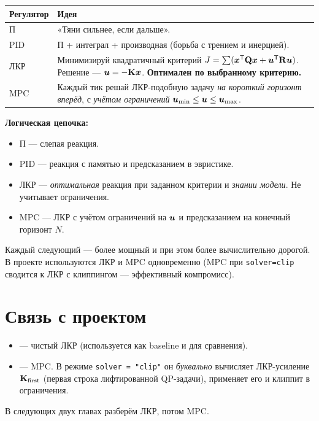 \begin{center}
\begin{tabular}{lp{8cm}}
\toprule
\textbf{Регулятор} & \textbf{Идея}\\
\midrule
П    & «Тяни сильнее, если дальше».\\
PID  & П + интеграл + производная (борьба с трением и инерцией).\\
ЛКР  & Минимизируй квадратичный критерий $J = \sum (\bm{x}^{\mathsf{T}} \mathbf{Q}\bm{x}
       + \bm{u}^{\mathsf{T}} \mathbf{R}\bm{u})$. Решение --- $\bm{u} = -\mathbf{K}\bm{x}$.
       \textbf{Оптимален по выбранному критерию.}\\
MPC  & Каждый тик решай ЛКР-подобную задачу \emph{на короткий горизонт
       вперёд}, с \emph{учётом ограничений} $\bm{u}_\text{min} \le \bm{u} \le \bm{u}_\text{max}$.\\
\bottomrule
\end{tabular}
\end{center}

\begin{ideabox}
\textbf{Логическая цепочка:}
\begin{itemize}
  \item П --- слепая реакция.
  \item PID --- реакция с памятью и предсказанием в эвристике.
  \item ЛКР --- \emph{оптимальная} реакция при заданном критерии и
        \emph{знании модели}. Не учитывает ограничения.
  \item MPC --- ЛКР с учётом ограничений на $\bm{u}$ и предсказанием
        на конечный горизонт $N$.
\end{itemize}
Каждый следующий --- более мощный и при этом более вычислительно дорогой.
В проекте используются ЛКР и MPC одновременно (MPC при \texttt{solver=clip}
сводится к ЛКР с клиппингом --- эффективный компромисс).
\end{ideabox}

\section{Связь с проектом}

\begin{codebox}[title={В проекте есть оба:}]
\begin{itemize}
  \item {} --- чистый ЛКР
        (используется как baseline и для сравнения).
  \item {} --- MPC. В режиме
        \texttt{solver = "clip"} он \emph{буквально} вычисляет ЛКР-усиление
        $\mathbf{K}_\text{first}$ (первая строка лифтированной QP-задачи),
        применяет его и клиппит в ограничения.
\end{itemize}
\end{codebox}

В следующих двух главах разберём ЛКР, потом MPC.
